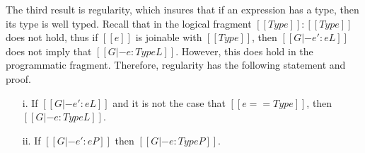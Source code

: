 The third result is regularity, which insures that if an expression
has a type, then its type is well typed.  Recall that in the logical
fragment $[[Type]] : [[Type]]$ does not hold, thus if $[[e]]$ is
joinable with $[[Type]]$, then $[[G |- e' : e L]]$ does not imply that
$[[G |- e : Type L]]$.  However, this does hold in the programmatic
fragment.  Therefore, regularity has the following statement and
proof.  
\begin{lemma}[Regularity]
  \label{lemma:regularity}
  \begin{itemize}
  \item[i.] If $[[G |- e':e L]]$ and it is not the case that $[[e == Type]]$, then $[[G |- e:Type L]]$.
  \item[ii.] If $[[G |- e':e P]]$ then $[[G |- e:Type P]]$.
  \end{itemize}
\end{lemma}
